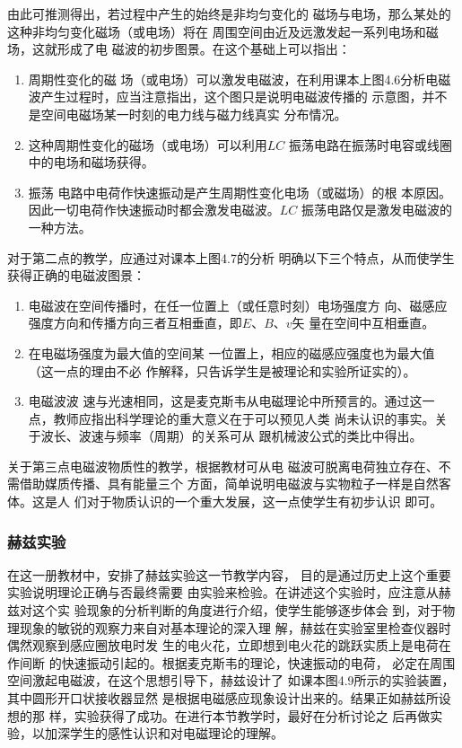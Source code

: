 由此可推测得出，若过程中产生的始终是非均匀变化的
磁场与电场，那么某处的这种非均匀变化磁场（或电场）将在
周围空间由近及远激发起一系列电场和磁场，这就形成了电
磁波的初步图景。在这个基础上可以指出：
\begin{enumerate}
\item 周期性变化的磁
场（或电场）可以激发电磁波，在利用课本上图4.6分析电磁
波产生过程时，应当注意指出，这个图只是说明电磁波传播的
示意图，并不是空间电磁场某一时刻的电力线与磁力线真实
分布情况。
\item 这种周期性变化的磁场（或电场）可以利用$LC$
振荡电路在振荡时电容或线圈中的电场和磁场获得。
\item 振荡
电路中电荷作快速振动是产生周期性变化电场（或磁场）的根
本原因。因此一切电荷作快速振动时都会激发电磁波。$LC$
振荡电路仅是激发电磁波的一种方法。
\end{enumerate}

对于第二点的教学，应通过对课本上图4.7的分析
明确以下三个特点，从而使学生获得正确的电磁波图景：
\begin{enumerate}
\item 电磁波在空间传播时，在任一位置上（或任意时刻）电场强度方
向、磁感应强度方向和传播方向三者互相垂直，即$E$、$B$、$v$矢
量在空间中互相垂直。
\item 在电磁场强度为最大值的空间某
一位置上，相应的磁感应强度也为最大值（这一点的理由不必
作解释，只告诉学生是被理论和实验所证实的）。
\item 电磁波波
速与光速相同，这是麦克斯韦从电磁理论中所预言的。通过这一点，教师应指出科学理论的重大意义在于可以预见人类
尚未认识的事实。关于波长、波速与频率（周期）的关系可从
跟机械波公式的类比中得出。
\end{enumerate}

关于第三点电磁波物质性的教学，根据教材可从电
磁波可脱离电荷独立存在、不需借助媒质传播、具有能量三个
方面，简单说明电磁波与实物粒子一样是自然客体。这是人
们对于物质认识的一个重大发展，这一点使学生有初步认识
即可。

\subsubsection{赫兹实验}

在这一册教材中，安排了赫兹实验这一节教学内容，
目的是通过历史上这个重要实验说明理论正确与否最终需要
由实验来检验。在讲述这个实验时，应注意从赫兹对这个实
验现象的分析判断的角度进行介绍，使学生能够逐步体会
到，对于物理现象的敏锐的观察力来自对基本理论的深入理
解，赫兹在实验室里检查仪器时偶然观察到感应圈放电时发
生的电火花，立即想到电火花的跳跃实质上是电荷在作间断
的快速振动引起的。根据麦克斯韦的理论，快速振动的电荷，
必定在周围空间激起电磁波，在这个思想引导下，赫兹设计了
如课本图4.9所示的实验装置，其中圆形开口状接收器显然
是根据电磁感应现象设计出来的。结果正如赫兹所设想的那
样，实验获得了成功。在进行本节教学时，最好在分析讨论之
后再做实验，以加深学生的感性认识和对电磁理论的理解。


